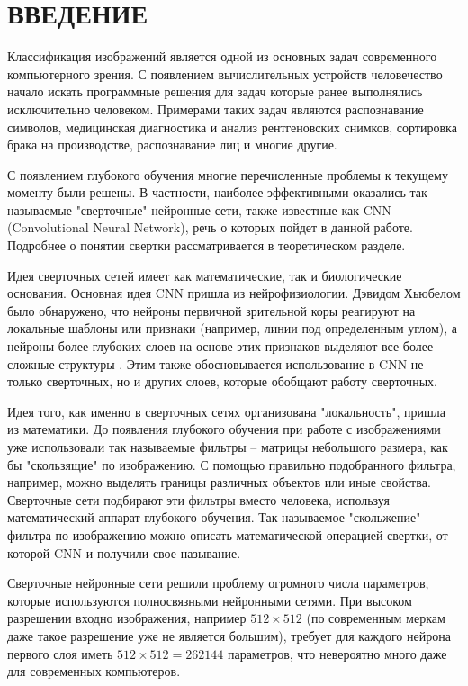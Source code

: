 \section*{ВВЕДЕНИЕ}

Классификация изображений является одной из основных задач современного компьютерного зрения.
С появлением вычислительных устройств человечество начало искать программные решения для задач которые ранее выполнялись исключительно человеком.
Примерами таких задач являются распознавание символов, медицинская диагностика и анализ рентгеновских снимков, сортировка брака на производстве, распознавание лиц и многие другие.

С появлением глубокого обучения многие перечисленные проблемы к текущему моменту были решены.
В частности, наиболее эффективными оказались так называемые "сверточные" нейронные сети, также известные как CNN (Convolutional Neural Network), речь о которых пойдет в данной работе.
Подробнее о понятии свертки рассматривается в теоретическом разделе.

Идея сверточных сетей имеет как математические, так и биологические основания.
Основная идея CNN пришла из нейрофизиологии.
Дэвидом Хьюбелом было обнаружено, что нейроны первичной зрительной коры реагируют на локальные шаблоны или признаки (например, линии под определенным углом), а нейроны более глубоких слоев на основе этих признаков выделяют все более сложные структуры \cite{dlbook}.
Этим также обосновывается использование в CNN не только сверточных, но и других слоев, которые обобщают работу сверточных.

Идея того, как именно в сверточных сетях организована "локальность", пришла из математики.
До появления глубокого обучения при работе с изображениями уже использовали так называемые фильтры -- матрицы небольшого размера, как бы "скользящие" по изображению.
С помощью правильно подобранного фильтра, например, можно выделять границы различных объектов или иные свойства.
Сверточные сети подбирают эти фильтры вместо человека, используя математический аппарат глубокого обучения. Так называемое "скольжение" фильтра по изображению можно описать математической операцией свертки, от которой CNN и получили свое называние.

Сверточные нейронные сети решили проблему огромного числа параметров, которые используются полносвязными нейронными сетями.
При высоком разрешении входно изображения, например $512 \times 512$ (по современным меркам даже такое разрешение уже не является большим),
требует для каждого нейрона первого слоя иметь $512 \times 512 = 262144$ параметров, что невероятно много даже для современных компьютеров.

